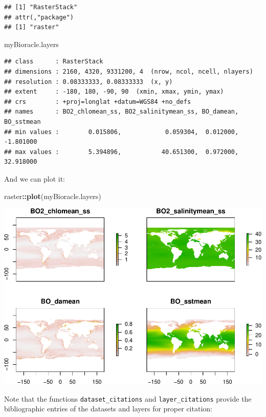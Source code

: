 \documentclass[
]{book}
\newenvironment{Shaded}{\begin{snugshade}}{\end{snugshade}}
\newcommand{\FunctionTok}[1]{\textcolor[rgb]{0.13,0.29,0.53}{\textbf{#1}}}
\newcommand{\NormalTok}[1]{#1}
\newcommand{\SpecialCharTok}[1]{\textcolor[rgb]{0.81,0.36,0.00}{\textbf{#1}}}
\begin{document}
\begin{verbatim}
## [1] "RasterStack"
## attr(,"package")
## [1] "raster"
\end{verbatim}

\begin{Shaded}
\begin{Highlighting}[]
\NormalTok{myBioracle.layers}
\end{Highlighting}
\end{Shaded}

\begin{verbatim}
## class      : RasterStack 
## dimensions : 2160, 4320, 9331200, 4  (nrow, ncol, ncell, nlayers)
## resolution : 0.08333333, 0.08333333  (x, y)
## extent     : -180, 180, -90, 90  (xmin, xmax, ymin, ymax)
## crs        : +proj=longlat +datum=WGS84 +no_defs 
## names      : BO2_chlomean_ss, BO2_salinitymean_ss, BO_damean, BO_sstmean 
## min values :        0.015806,            0.059304,  0.012000,  -1.801000 
## max values :        5.394896,           40.651300,  0.972000,  32.918000
\end{verbatim}

And we can plot it:

\begin{Shaded}
\begin{Highlighting}[]
\NormalTok{raster}\SpecialCharTok{::}\FunctionTok{plot}\NormalTok{(myBioracle.layers)}
\end{Highlighting}
\end{Shaded}

\includegraphics{_main_files/figure-latex/unnamed-chunk-34-1.pdf}

Note that the functions \texttt{dataset\_citations} and \texttt{layer\_citations} provide the bibliographic entries of the datasets and layers for proper citation:
\end{document}
